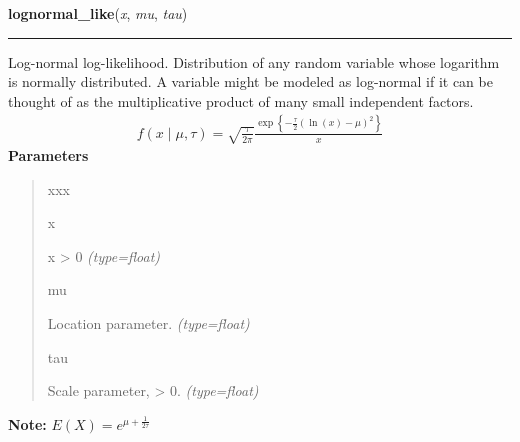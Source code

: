 \hspace{.8\funcindent}\begin{boxedminipage}{\funcwidth}

    \raggedright \textbf{lognormal\_like}(\textit{x}, \textit{mu}, \textit{tau})

    \vspace{-1.5ex}

    \rule{\textwidth}{1pt}
\setlength{\parskip}{2ex}

Log-normal log-likelihood. Distribution of any random variable whose
logarithm is normally distributed. A variable might be modeled as
log-normal if it can be thought of as the multiplicative product of many
small independent factors.
\begin{equation*}\begin{split}f(x \mid \mu, \tau) = \sqrt{\frac{\tau}{2\pi}}\frac{\exp\left\{ -\frac{\tau}{2} (\ln(x)-\mu)^2 \right\}}{x}\end{split}\end{equation*}\setlength{\parskip}{1ex}
      \textbf{Parameters}
      \vspace{-1ex}

      \begin{quote}
        \begin{Ventry}{xxx}

          \item[x]


x {\textgreater} 0
            {\it (type=float)}

          \item[mu]


Location parameter.
            {\it (type=float)}

          \item[tau]


Scale parameter, {\textgreater} 0.
            {\it (type=float)}

        \end{Ventry}

      \end{quote}

\textbf{Note:} 
$E(X)=e^{\mu+\frac{1}{2\tau}}$


    \end{boxedminipage}

    \label{distributions:mod_categor_like}

    \vspace{0.5ex}

